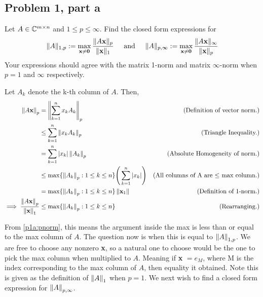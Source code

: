 \subsection{Problem 1, part a} Let $A \in \mathbb{C}^{m \times n}$ and $1 \leq p \leq \infty$. Find the closed form expressions for 
\[
\lVert A \rVert_{1, p} := \max_{\textbf{x} \neq \textbf{0}} \frac{\lVert A\textbf{x} \rVert_{p}}{\lVert \textbf{x} \rVert_1} \hspace{5mm} \text{and} \hspace{5mm} \lVert A \rVert_{p, \infty} := \max_{\textbf{x} \neq \textbf{0}} \frac{\lVert A\textbf{x} \rVert_{\infty}}{\lVert \textbf{x} \rVert_p} 
\]
Your expressions should agree with the matrix 1-norm and matrix $\infty$-norm when $p = 1$ and $\infty$ respectively.
\partbreak
\begin{solution}

    Let $A_k$ denote the k-th column of $A$. Then, 
    \alignbreak
    \begin{align}
        \left\lVert A\textbf{x}\right\rVert_p &= \left\lVert\sum_{k = 1}^n x_kA_k\right\rVert_p &\text{(Definition of vector norm.)}\nonumber\\
        &\leq \sum_{k = 1}^n \left\lVert x_kA_k\right\rVert_p &\text{(Triangle Inequality.)}\nonumber\\
        &= \sum_{k = 1}^n|x_k|\left\lVert A_k\right\rVert_p &\text{(Absolute Homogeneity of norm.)}\nonumber\\
        &\leq \max \{ \left\lVert A_k\right\rVert_p : 1 \leq k \leq n \} \Bigg(\sum_{k = 1}^n |x_k| \Bigg) &\text{(All columns of A are $\leq$ max column.)}\nonumber\\
        &=\max \{ \left\lVert A_k\right\rVert_p : 1 \leq k \leq n \} \left\lVert\textbf{x}_1\right\rVert &\text{(Definition of 1-norm.)}\nonumber\\
        \implies \frac{\left\lVert A\textbf{x}\right\rVert_p}{\left\lVert\textbf{x}\right\rVert_1} &\leq \max \{\left\lVert A_k\right\rVert_p : 1 \leq k \leq n \} &\text{(Rearranging.)}\label{p1a:pnorm}
    \end{align}
    \alignbreak

    From \ref{p1a:pnorm}, this means the argument inside the max is less than or equal to the max column of $A$. The question now is when this is equal to $\left\lVert A\right\rVert_{1,p}$. We are free to choose any nonzero \textbf{x}, so a natural one to choose would be the one to pick the max column when multiplied to $A$. Meaning if \textbf{x} $= e_M$, where M is the index corresponding to the max column of $A$, then equality it obtained. Note this is given as the definition of $\left\lVert A\right\rVert_1$ when $p = 1$. 
\newpage
    We next wish to find a closed form expression for $\left\lVert A\right\rVert_{p, \infty}$.
\end{solution}




